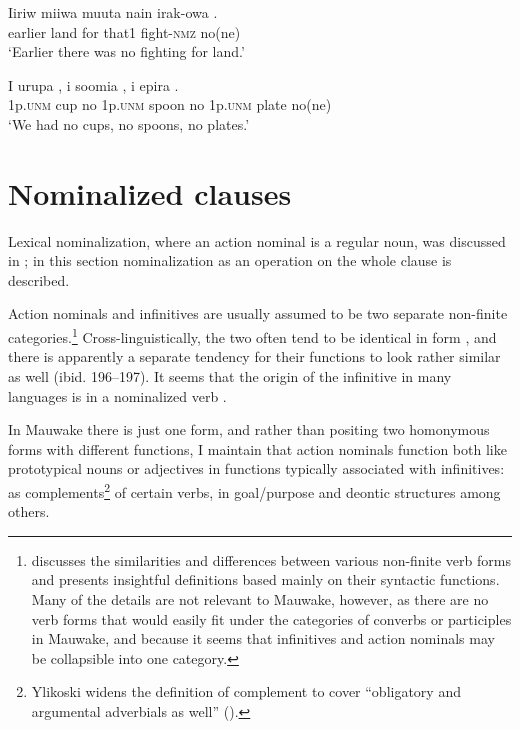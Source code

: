 \ea%
\label{ex:5:x982}
\gll Iiriw  miiwa  muuta  nain  irak-owa  . \\
     earlier  land  for  that1  fight-\textsc{nmz}  no(ne) \\
\glt `Earlier there was no fighting for land.'
\z

\ea%
\label{ex:5:x983}
\gll I  urupa  ,  i  soomia  ,  i epira  . \\
     1p.\textsc{unm}  cup  no  1p.\textsc{unm}  spoon  no  1p.\textsc{unm} plate  no(ne) \\
\glt `We had no cups, no spoons, no plates.'
\z

\section{Nominalized clauses} \label{sec:5.7}

Lexical nominalization, where an action nominal is a regular noun, was discussed in ; in this section nominalization as an operation on the whole clause is described.

Action nominals and infinitives are usually assumed to be two separate non-finite categories.\footnote{\citet{Ylikoski2003,Ylikoski2009} discusses the similarities and differences between various non-finite verb forms and presents insightful definitions based mainly on their syntactic functions. Many of the details are not relevant to Mauwake, however, as there are no verb forms that would easily fit under the categories of converbs or participles in Mauwake, and because it seems that infinitives and action nominals may be collapsible into one category.} Cross-linguistically, the two often tend to be identical in form \citep[224]{Ylikoski2003}, and there is apparently a separate tendency for their functions to look rather similar as well (ibid. 196--197). It seems that the origin of the infinitive in many languages is in a nominalized verb \citep[69]{Noonan2007}. 

In Mauwake there is just one form, and rather than positing two homonymous forms with different functions, I maintain that action nominals function both like prototypical nouns or adjectives  in functions typically associated with infinitives: as complements\footnote{Ylikoski widens the definition of complement to cover ``obligatory and argumental adverbials as well'' (\citeyear[209]{Ylikoski2003}).} of certain verbs, in goal/purpose and deontic structures among others.  

